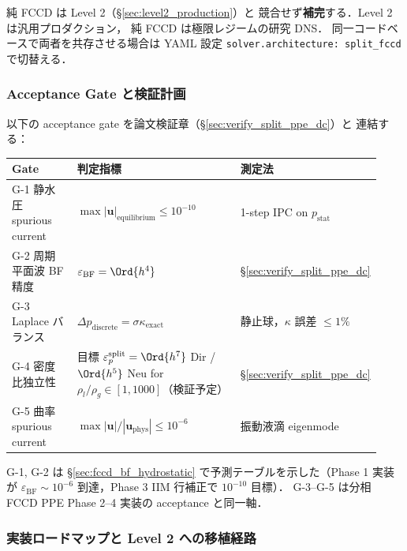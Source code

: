 純 FCCD は Level 2（§\ref{sec:level2_production}）と
競合せず\textbf{補完}する．Level 2 は汎用プロダクション，
純 FCCD は極限レジームの研究 DNS．
同一コードベースで両者を共存させる場合は
YAML 設定 \verb|solver.architecture: split_fccd| で切替える．

\subsubsection{Acceptance Gate と検証計画}
\label{sec:pure_fccd_gates}

以下の acceptance gate を論文検証章（§\ref{sec:verify_split_ppe_dc}）と
連結する：

\begin{center}
\small
\begin{tabular}{@{}p{0.18\linewidth}p{0.45\linewidth}p{0.30\linewidth}@{}}
\hline
Gate & 判定指標 & 測定法 \\
\hline
G-1 静水圧 spurious current & $\max|\mathbf{u}|_\text{equilibrium} \le 10^{-10}$
  & 1-step IPC on $p_\text{stat}$ \\
G-2 周期平面波 BF 精度 & $\varepsilon_\text{BF} = \Ord{h^4}$
  & §\ref{sec:verify_split_ppe_dc} \\
G-3 Laplace バランス & $\Delta p_\text{discrete} = \sigma\kappa_\text{exact}$
  & 静止球，$\kappa$ 誤差 $\le 1\%$ \\
G-4 密度比独立性 & 目標 $\varepsilon_p^\text{split} = \Ord{h^7}$ Dir / $\Ord{h^5}$ Neu
  for $\rho_l/\rho_g\in[1,1000]$（検証予定）
  & §\ref{sec:verify_split_ppe_dc} \\
G-5 曲率 spurious current & $\max|\mathbf{u}|/|\mathbf{u}_\text{phys}| \le 10^{-6}$
  & 振動液滴 eigenmode \\
\hline
\end{tabular}
\end{center}

G-1, G-2 は §\ref{sec:fccd_bf_hydrostatic} で予測テーブルを示した（Phase 1
実装が $\varepsilon_\text{BF}\sim 10^{-6}$ 到達，Phase 3 IIM 行補正で
$10^{-10}$ 目標）．
G-3--G-5 は分相 FCCD PPE Phase 2--4 実装の
acceptance と同一軸．

\subsubsection{実装ロードマップと Level 2 への移植経路}
\label{sec:pure_fccd_roadmap}

